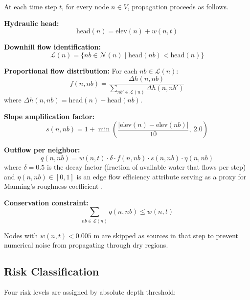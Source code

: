 \documentclass[journal]{IEEEtran}
\begin{document}
At each time step $t$, for every node $n \in V$, propagation proceeds as follows.

\textbf{Hydraulic head:}
\begin{equation}
  \text{head}(n) = \text{elev}(n) + w(n, t)
  \label{eq:head}
\end{equation}

\textbf{Downhill flow identification:}
\begin{equation}
  \mathcal{L}(n) = \{ nb \in \mathcal{N}(n) \mid \text{head}(nb) < \text{head}(n) \}
  \label{eq:lower}
\end{equation}

\textbf{Proportional flow distribution:} For each $nb \in \mathcal{L}(n)$:
\begin{equation}
  f(n, nb) = \frac{\Delta h(n, nb)}{\sum_{nb' \in \mathcal{L}(n)} \Delta h(n, nb')}
  \label{eq:flow_frac}
\end{equation}
where $\Delta h(n, nb) = \text{head}(n) - \text{head}(nb)$.

\textbf{Slope amplification factor:}
\begin{equation}
  s(n, nb) = 1 + \min\!\left(\frac{|\text{elev}(n) - \text{elev}(nb)|}{10},\ 2.0\right)
  \label{eq:slope}
\end{equation}

\textbf{Outflow per neighbor:}
\begin{equation}
  q(n, nb) = w(n,t) \cdot \delta \cdot f(n, nb) \cdot s(n, nb) \cdot \eta(n, nb)
  \label{eq:outflow}
\end{equation}
where $\delta = 0.5$ is the decay factor (fraction of available water that flows per step)
and $\eta(n, nb) \in [0,1]$ is an edge flow efficiency attribute serving as a proxy for
Manning's roughness coefficient \cite{rossman2010}.

\textbf{Conservation constraint:}
\begin{equation}
  \sum_{nb \in \mathcal{L}(n)} q(n, nb) \leq w(n, t)
  \label{eq:conservation}
\end{equation}

Nodes with $w(n,t) < 0.005$ m are skipped as sources in that step to prevent numerical
noise from propagating through dry regions.

\subsection{Risk Classification}

Four risk levels are assigned by absolute depth threshold:
\end{document}
